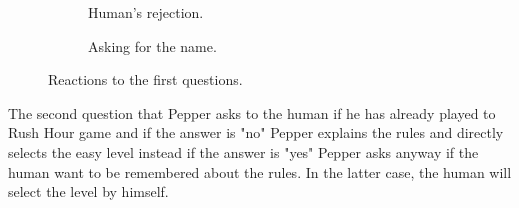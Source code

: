\documentclass{article}
\begin{document}
\begin{figure}[H]
\begin{subfigure}{.33\textwidth}
      \caption{Human's rejection. }
    \end{subfigure}
    \begin{subfigure}{.33\textwidth}
      \centering
      \caption{Asking for the name.}
    \end{subfigure}
    \caption{Reactions to the first questions.}
    \label{fig:first}
\end{figure}

The second question that Pepper asks to the human if he has already played to Rush Hour game and if the answer is "no" Pepper explains the rules and directly selects the easy level instead if the answer is "yes" Pepper asks anyway if the human want to be remembered about the rules. In the latter case, the human will select the level by himself. 
\end{document}
